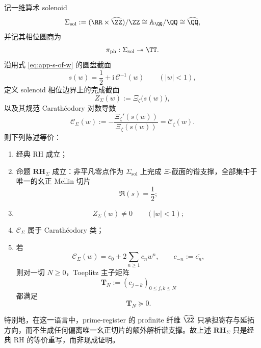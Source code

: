 \begin{theorem}\label{thm:conclusion-classical-rh-arithmetic-solenoid-restatement}
记一维算术 solenoid
\[
\Sigma_{\mathrm{sol}}
:=
(\RR\times \widehat{\ZZ})/\ZZ
\cong
\mathbb A_{\QQ}/\QQ
\cong
\widehat{\QQ},
\]
并记其相位圆商为
\[
\pi_{\mathrm{ph}}:\Sigma_{\mathrm{sol}}\twoheadrightarrow \TT.
\]
沿用式 \eqref{eq:app-s-of-w} 的圆盘截面
\[
s(w)=\frac12+\mathrm{i}\,\mathcal{C}^{-1}(w)
\qquad (|w|<1),
\]
定义 solenoid 相位边界上的完成截面
\[
Z_{\Sigma}(w):=\Xi_{\zeta}\!\bigl(s(w)\bigr),
\]
以及其规范 Carath\'eodory 对数导数
\[
\mathscr C_{\Sigma}(w)
:=
-\frac{\Xi_\zeta'(s(w))}{\Xi_\zeta(s(w))}
=
\mathscr C_\zeta(w).
\]
则下列陈述等价：
\begin{enumerate}
  \item 经典 RH 成立；
  \item 命题 \(\mathbf{RH}_{\Sigma}\) 成立：非平凡零点作为 \(\Sigma_{\mathrm{sol}}\) 上完成 \(\Xi\)-截面的谱支撑，全部集中于唯一的幺正 Mellin 切片
  \[
  \Re(s)=\frac12;
  \]
  \item
  \[
  Z_{\Sigma}(w)\neq 0
  \qquad (|w|<1);
  \]
  \item \(\mathscr C_{\Sigma}\) 属于 Carath\'eodory 类；
  \item 若
  \[
  \mathscr C_{\Sigma}(w)=c_0+2\sum_{n\ge 1}c_n w^n,
  \qquad c_{-n}:=\overline{c_n},
  \]
  则对一切 \(N\ge 0\)，Toeplitz 主子矩阵
  \[
  \mathbf T_N:=(c_{j-k})_{0\le j,k\le N}
  \]
  都满足
  \[
  \mathbf T_N\succeq 0.
  \]
\end{enumerate}
特别地，在这一语言中，prime-register 的 profinite 纤维 \(\widehat{\ZZ}\) 只承担寄存与延拓方向，而不生成任何偏离唯一幺正切片的额外解析谱支撑。故上述 \(\mathbf{RH}_{\Sigma}\) 只是经典 RH 的等价重写，而非现成证明。
\end{theorem}
